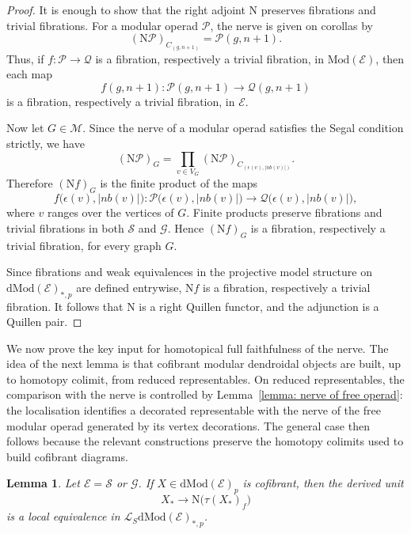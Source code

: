 \documentclass{amsart}
\newcommand{\bE}{\mathscr{E}}
\newcommand{\bM}{\mathscr{M}}
\newcommand{\calQ}{\mathcal{Q}}
\newcommand{\sSet}{\mathscr{S}}
\newcommand{\Grpd}{\mathscr{G}}
\newcommand{\calP}{\mathcal{P}}
\newcommand{\Mod}{\mathrm{Mod}}
\newcommand{\dMod}{\mathrm{dMod}}
\newcommand{\nerve}{\mathrm{N}}
\newcommand{\nb}{nb}
\newcommand{\corolla}{C}
\newtheorem{lemma}[theorem]{Lemma}%
\theoremstyle{definition}
\numberwithin{equation}{section}
\begin{document}
\begin{proof}
It is enough to show that the right adjoint $\nerve$ preserves fibrations and
trivial fibrations. For a modular operad $\calP$, the nerve is given on corollas
by
\[
(\nerve\calP)_{\corolla_{(g,n+1)}}=\calP(g,n+1).
\]
Thus, if $f:\calP\to\calQ$ is a fibration, respectively a trivial fibration,
in $\Mod(\bE)$, then each map
\[
f(g,n+1):\calP(g,n+1)\longrightarrow \calQ(g,n+1)
\]
is a fibration, respectively a trivial fibration, in $\bE$.

Now let $G\in\bM$. Since the nerve of a modular operad satisfies the Segal condition strictly, we have
\[
(\nerve\calP)_G = \prod_{v\in V_G} (\nerve\calP)_{\corolla_{(\epsilon(v),|\nb(v)|)}}.
\]
Therefore $(\nerve f)_G$ is the finite product of the maps
\[
f\bigl(\epsilon(v),|\nb(v)|\bigr):
\calP\bigl(\epsilon(v),|\nb(v)|\bigr)
\longrightarrow
\calQ\bigl(\epsilon(v),|\nb(v)|\bigr),
\] where $v$ ranges over the vertices of $G$.  Finite products preserve fibrations and trivial fibrations in both $\sSet$ and $\Grpd$. Hence $(\nerve f)_G$ is a fibration, respectively a trivial fibration, for every graph $G$. 

Since fibrations and weak equivalences in the projective model structure on $\dMod(\bE)_{*,p}$ are defined entrywise, $\nerve f$ is a fibration, respectively a trivial fibration. It follows that $\nerve$ is a right Quillen functor, and the adjunction is a Quillen pair.
\end{proof}

\medskip

We now prove the key input for homotopical full faithfulness of the nerve. The idea of the next lemma is that cofibrant modular dendroidal objects are built, up to homotopy colimit, from reduced representables. On reduced representables, the comparison with the nerve is controlled by Lemma~\ref{lemma: nerve of free operad}: the localisation identifies a decorated representable with the nerve of the free modular operad generated by its vertex decorations. The general case then follows because the relevant constructions preserve the homotopy colimits used to build cofibrant diagrams.

\begin{lemma}\label{derived unit}
Let $\bE=\sSet$ or $\Grpd$. If $X\in\dMod(\bE)_p$ is cofibrant, then the derived unit
\[
X_* \longrightarrow \nerve\bigl(\tau(X_*)_f\bigr)
\]
is a local equivalence in $\mathcal{L}_{S}\dMod(\bE)_{*,p}$.
\end{lemma}
\end{document}
